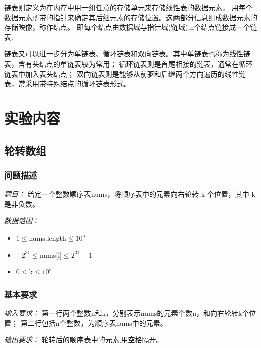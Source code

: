 \documentclass[a4paper,11pt]{article}%
\newenvironment{shadedquotation}
 {\begin{shaded*}
  \quoting[leftmargin=0pt, vskip=0pt]
 }
 {\endquoting
 \end{shaded*}
}
\begin{document}
链表则定义为在内存中用一组任意的存储单元来存储线性表的数据元素，
用每个数据元素所带的指针来确定其后继元素的存储位置。这两部分信息组成数据元素的存储映像，称作结点。
即每个结点由数据域与指针域(链域),n个结点链接成一个链表.

链表又可以进一步分为单链表、循环链表和双向链表。其中单链表也称为线性链表，含有头结点的单链表较为常用；
循环链表则是首尾相接的链表，通常在循环链表中加入表头结点；
双向链表则是能够从前驱和后继两个方向遍历的线性链表，常采用带特殊结点的循环链表形式。

\section{实验内容}
\subsection{轮转数组}
\subsubsection{问题描述}
\begin{shadedquotation}
\noindent\emph{题目：}
 给定一个整数顺序表nums，将顺序表中的元素向右轮转 k 个位置，其中 k 是非负数。   
\end{shadedquotation}
\begin{shadedquotation}
    \emph{数据范围：}
    \begin{itemize}
        \item $1 \leq $nums.length$ \leq 10^5$
        \item $-2^{31} \leq $nums[i]$ \leq 2^{31}-1$
        \item $0 \leq $k$ \leq 10^5$
    \end{itemize}
\end{shadedquotation}
\subsubsection{基本要求}
\begin{shadedquotation}
    \emph{输入要求：}
     第一行两个整数n和k，分别表示nums的元素个数n，和向右轮转k个位置；
第二行包括n个整数，为顺序表nums中的元素。
\end{shadedquotation}
\begin{shadedquotation}
    \emph{输出要求：}
    轮转后的顺序表中的元素,用空格隔开。
\end{shadedquotation}
\end{document}
